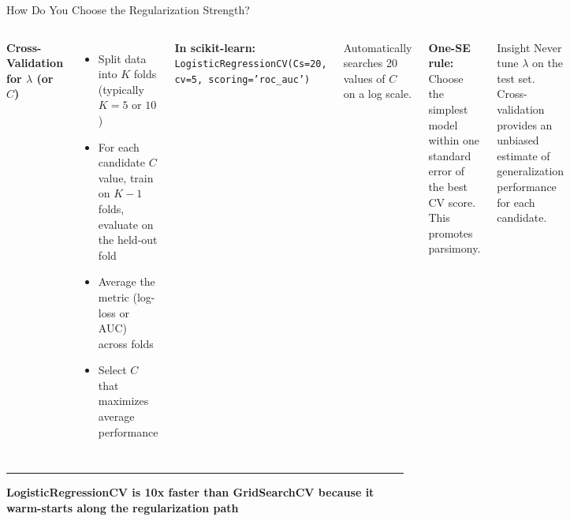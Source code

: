 \documentclass[8pt,aspectratio=169]{beamer}
\newcommand{\bottomnote}[1]{%
\vfill
\vspace{-2mm}
\textcolor{mllavender2}{\rule{\textwidth}{0.4pt}}
\vspace{1mm}
\footnotesize
\textbf{#1}
}
\newenvironment{compactlist}{%
  \begin{itemize}%
    \setlength{\itemsep}{2pt}%
    \setlength{\parskip}{0pt}%
    \setlength{\parsep}{0pt}%
}{%
  \end{itemize}%
}
\begin{document}
\begin{frame}[t]{How Do You Choose the Regularization Strength?}
\begin{columns}[T]
\small
\textbf{Cross-Validation for $\lambda$ (or $C$)}

\scriptsize
\begin{compactlist}
\item Split data into $K$ folds (typically $K=5$ or $10$)
\item For each candidate $C$ value, train on $K-1$ folds, evaluate on the held-out fold
\item Average the metric (log-loss or AUC) across folds
\item Select $C$ that maximizes average performance
\end{compactlist}

\vspace{2mm}
\textbf{In scikit-learn:}
\texttt{LogisticRegressionCV(Cs=20, cv=5, scoring='roc\_auc')}

Automatically searches 20 values of $C$ on a log scale.

\vspace{2mm}
\textbf{One-SE rule:} Choose the simplest model within one standard error of the best CV score. This promotes parsimony.

\begin{block}{Insight}
\scriptsize Never tune $\lambda$ on the test set. Cross-validation provides an unbiased estimate of generalization performance for each candidate.
\end{block}

\footnotesize
\vspace{4mm}
\end{columns}

\bottomnote{LogisticRegressionCV is 10x faster than GridSearchCV because it warm-starts along the regularization path}
\end{frame}
\end{document}
